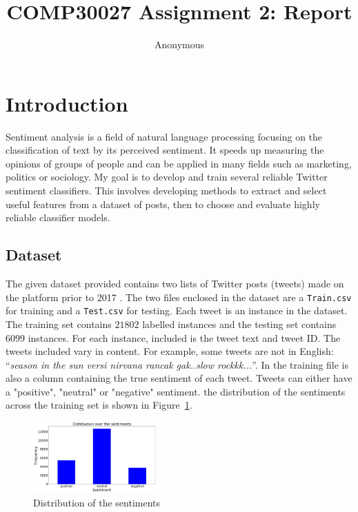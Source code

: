\documentclass[11pt]{article}
\title{COMP30027 Assignment 2: Report}
\author
{Anonymous}
\begin{document}
\maketitle

\section{Introduction}\label{sec:intro}

Sentiment analysis is a field of natural language processing focusing on the classification of text by its perceived sentiment.
It speeds up measuring the opinions of groups of people and can be applied in many fields such as marketing, politics or sociology.
My goal is to develop and train several reliable {T}witter sentiment classifiers.
This involves developing methods to extract and select useful features from a dataset of posts, 
then to choose and evaluate highly reliable classifier models.

\subsection{Dataset}\label{sec:dataset}

The given dataset provided contains two lists of {T}witter posts (tweets) made on the platform prior to 2017 \cite{dataset}.
The two files enclosed in the dataset are a \texttt{Train.csv} for training and a \texttt{Test.csv} for testing. 
Each tweet is an instance in the dataset.
The training set contains $21802$ labelled instances and the testing set contains $6099$ instances. 
For each instance, included is the tweet text and tweet ID. 
The tweets included vary in content.
For example, some tweets are not in English: ``\textit{season in the sun versi nirvana rancak gak..slow rockkk...}''.
In the training file is also a column containing the true sentiment of each tweet. 
Tweets can either have a "positive", "neutral" or "negative" sentiment.
the distribution of the sentiments across the training set is shown in Figure~\ref{fig:sent-dist}.

\begin{figure}[!h]
	\centering
	\includegraphics[width = 0.42\textwidth]{sentiment-distribution.png}
	\caption{Distribution of the sentiments}
	\label{fig:sent-dist}
\end{figure} 
\end{document}
